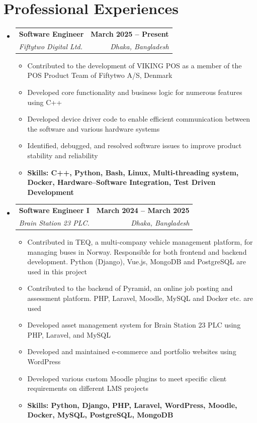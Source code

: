 \documentclass[letterpaper,11pt]{article}
\makeatletter
\newcommand{\resumeSubHeadingListStart}{\begin{itemize}[leftmargin=0.0in, label={}]}
\newcommand{\resumeSubheading}[4]{
  \item
    \begin{tabular*}{1.0\textwidth}[t]{l@{\extracolsep{\fill}}r}
        \textbf{#1} & \textbf{\small #2} \\
        \textit{\small#3} & \textit{\small #4} \\
    \end{tabular*}
}
\newcommand{\resumeSubHeadingListEnd}{\end{itemize}}
\newcommand{\ExperienceItemListStart}{\vspace{5pt}\begin{itemize}[leftmargin=0.3in]}
\newcommand{\ExperienceItemListEnd}{\end{itemize}}
\newcommand{\resumeItem}[1]{\item {#1}}
\newcommand{\resumeItemSmall}[1]{\item \small{#1}}
\makeatother
\begin{document}
\section{Professional Experiences}
\resumeSubHeadingListStart
    \resumeSubheading
    {Software Engineer}{March 2025 -- Present}
    {Fiftytwo Digital Ltd.}{Dhaka, Bangladesh}
    \vspace{-10pt}
    \ExperienceItemListStart
        \resumeItemSmall{Contributed to the development of VIKING POS as a member of the POS Product Team of Fiftytwo A/S, Denmark} \vspace{-2pt}
        \resumeItemSmall{Developed core functionality and business logic for numerous features using C++} \vspace{-2pt}
        \resumeItemSmall{Developed device driver code to enable efficient communication between the software and various hardware systems} \vspace{-2pt}
        \resumeItemSmall{Identified, debugged, and resolved software issues to improve product stability and reliability} \vspace{-2pt}
        \resumeItem{\textbf{Skills: C++, Python, Bash, Linux, Multi-threading system, Docker, Hardware–Software Integration, Test Driven Development}}
    \ExperienceItemListEnd
    
    \vspace{2pt} %

    \resumeSubheading
    {Software Engineer I}{March 2024 -- March 2025}
    {Brain Station 23 PLC.}{Dhaka, Bangladesh}
    \vspace{-12pt}
    \ExperienceItemListStart
        \resumeItemSmall{Contributed in TEQ, a multi-company vehicle management platform, for managing buses in Norway. Responsible for both frontend and backend development. Python (Django), Vue.js, MongoDB and PostgreSQL are used in this project} \vspace{-2pt}
        \resumeItemSmall{Contributed to the backend of Pyramid, an online job posting and assessment platform. PHP, Laravel, Moodle, MySQL and Docker etc. are used} \vspace{-2pt}
        \resumeItemSmall{Developed asset management system for Brain Station 23 PLC using PHP, Laravel, and MySQL} \vspace{-2pt}
        \resumeItemSmall{Developed and maintained e-commerce and portfolio websites using WordPress} \vspace{-2pt}
        \resumeItemSmall{Developed various custom Moodle plugins to meet specific client requirements on different LMS projects} \vspace{-2pt}
        \resumeItem{\textbf{Skills: Python, Django, PHP, Laravel, WordPress, Moodle, Docker, MySQL, PostgreSQL, MongoDB}}
    \ExperienceItemListEnd
\resumeSubHeadingListEnd
\end{document}
